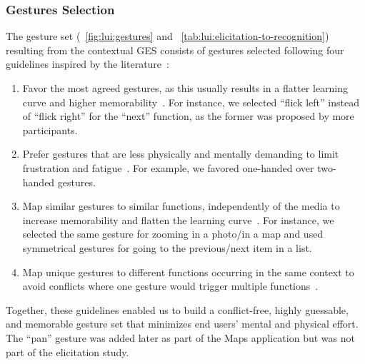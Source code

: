\subsubsection{Gestures Selection} 
The \lui gesture set (\fig~\ref{fig:lui:gestures} and \tab~\ref{tab:lui:elicitation-to-recognition}) resulting from the contextual GES consists of gestures selected following four guidelines inspired by the literature~\cite{Morris:2010,Wobbrock:2005,Wobbrock:2009,Dingler:2018}:
\begin{enumerate}[noitemsep]
    \item Favor the most agreed gestures, as this usually results in a flatter learning curve and higher memorability~\cite{Wobbrock:2005,Wobbrock:2009,Dingler:2018}. For instance, we selected ``flick left'' instead of ``flick right'' for the ``next'' function, as the former was proposed by more participants.
    \item Prefer gestures that are less physically and mentally demanding to limit frustration and fatigue~\cite{Morris:2010}. For example, we favored one-handed over two-handed gestures.
    \item Map similar gestures to similar functions, independently of the media to increase memorability and flatten the learning curve~\cite{Dingler:2018}. For instance, we selected the same gesture for zooming in a photo/in a map and used symmetrical gestures for going to the previous/next item in a list.
    \item Map unique gestures to different functions occurring in the same context to avoid conflicts where one gesture would trigger multiple functions~\cite{Wobbrock:2005,Dingler:2018}.
\end{enumerate}
Together, these guidelines enabled us to build a conflict-free, highly guessable, and memorable gesture set that minimizes end users' mental and physical effort. The ``pan'' gesture was added later as part of the Maps application but was not part of the elicitation study.



